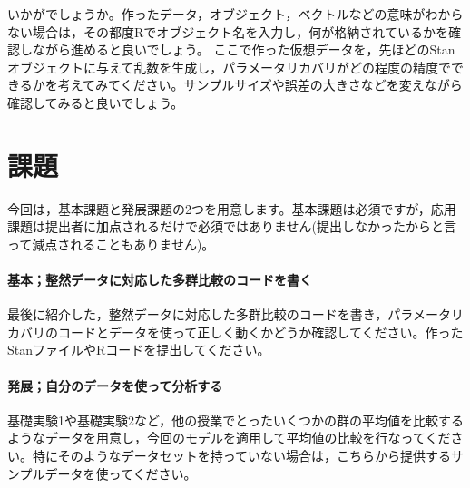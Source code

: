 \documentclass{ltjsbook}
\begin{document}
いかがでしょうか。作ったデータ，オブジェクト，ベクトルなどの意味がわからない場合は，その都度Rでオブジェクト名を入力し，何が格納されているかを確認しながら進めると良いでしょう。
ここで作った仮想データを，先ほどのStanオブジェクトに与えて乱数を生成し，パラメータリカバリがどの程度の精度でできるかを考えてみてください。サンプルサイズや誤差の大きさなどを変えながら確認してみると良いでしょう。
\section{課題}
今回は，基本課題と発展課題の2つを用意します。基本課題は必須ですが，応用課題は提出者に加点されるだけで必須ではありません(提出しなかったからと言って減点されることもありません)。

\paragraph{基本；整然データに対応した多群比較のコードを書く}最後に紹介した，整然データに対応した多群比較のコードを書き，パラメータリカバリのコードとデータを使って正しく動くかどうか確認してください。作ったStanファイルやRコードを提出してください。
\paragraph{発展；自分のデータを使って分析する}基礎実験1や基礎実験2など，他の授業でとったいくつかの群の平均値を比較するようなデータを用意し，今回のモデルを適用して平均値の比較を行なってください。特にそのようなデータセットを持っていない場合は，こちらから提供するサンプルデータを使ってください。
\end{document}
